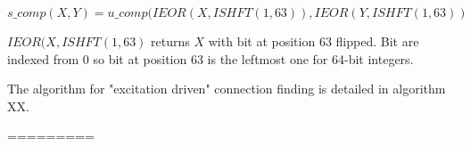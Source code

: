 \documentclass[./thesis.tex]{subfiles}
\begin{document}
\begin{equation}
s\_comp(X,Y) = u\_comp(IEOR(X,ISHFT(1,63)), IEOR(Y,ISHFT(1,63))
\end{equation}


$IEOR(X,ISHFT(1,63)$ returns $X$ with bit at position 63 flipped. Bit are indexed from 0 so bit at position 63 is the leftmost one for 64-bit integers.

The algorithm for "excitation driven" connection finding is detailed in algorithm XX.

=========

\end{document}
